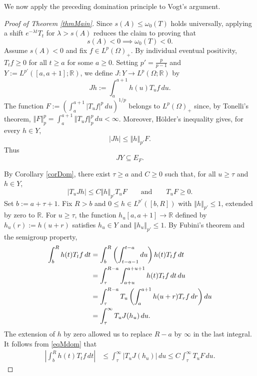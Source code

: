 \documentclass[12pt]{amsart}
\theoremstyle{plain}
\theoremstyle{definition}
\newcommand{\R}{\mathbb{R}}
\newcommand{\norm}[1]{\left\Vert #1\right\Vert}
\begin{document}
	We now apply the preceding domination principle to Vogt's argument.
	
	\begin{proof}[Proof of Theorem \ref{thmMain}]
		
		Since $s(A) \le \omega_0(T)$ holds universally, applying a shift $e^{-\lambda t}T_t$ for $\lambda > s(A)$ reduces the claim to proving that
		\[
		s(A) < 0 \implies \omega_0(T) < 0.
		\]
		Assume $s(A) < 0$ and fix $f \in L^p(\Omega)_+$. By individual eventual positivity, $T_t f \ge 0$ for all $t \ge a$ for some $a \ge 0$. Setting $p' = \frac{p}{p-1}$ and $Y := L^{p'}([a,a+1]; \mathbb{R})$, we define $J \colon Y \to L^p(\Omega; \mathbb{R})$ by
		\[
		Jh := \int_a^{a+1} h(u) T_u f \, du.
		\]
		The function $F := \left( \int_a^{a+1} |T_u f|^p \, du \right)^{1/p}$ belongs to $L^p(\Omega)_+$ since, by Tonelli's theorem, $\norm{F}_p^p = \int_a^{a+1} \norm{T_u f}_p^p \, du < \infty$.
		Moreover, H\"older's inequality gives, for every $h\in Y$,
		\begin{equation}
			\label{eqJf}
			|Jh|
			\le
			\norm{h}_{p'}F.
		\end{equation}
		Thus
		\[
		JY\subseteq E_F.
		\]
		
		By Corollary \ref{corDom}, there exist $\tau \ge a$ and $C \ge 0$ such that, for all $u \ge \tau$ and $h \in Y$,
		\begin{equation}
			\label{eqMdom}
			|T_u Jh| \le C \norm{h}_{p'} T_u F \qquad \text{and} \qquad T_u F \ge 0.
		\end{equation}
		Set $b := a + \tau + 1$. Fix $R > b$ and $0 \le h \in L^{p'}([b,R])$ with $\norm{h}_{p'} \le 1$, extended by zero to $\mathbb{R}$. For $u \ge \tau$, the function $h_u [a,a+1] \rightarrow \R$ defined by $h_u(r) := h(u+r)$ satisfies $h_u \in Y$ and $\norm{h_u}_{p'} \le 1$.
		By Fubini's theorem and the semigroup property,
		\begin{align}
			\int_b^R h(t)T_tf\,dt
			&=
			\int_b^R
			\left(
			\int_{t-a-1}^{t-a}du
			\right)
			h(t)T_tf\,dt
			\notag\\
			&=
			\int_\tau^{R-a}
			\int_{a+u}^{a+u+1}
			h(t)T_tf\,dt\,du
			\notag\\
			&=
			\int_\tau^{R-a}
			T_u
			\left(
			\int_a^{a+1}
			h(u+r)T_rf\,dr
			\right)
			du
			\notag\\
			&=
			\int_\tau^{\infty}
			T_uJ(h_u)\,du.
			\label{eqFub}
		\end{align}
		The extension of $h$ by zero allowed us to replace
		$R-a$ by $\infty$ in the last integral.
		It follows from \eqref{eqMdom} that
		\begin{align}\label{eqAvg}
			\left|
			\int_b^R h(t)T_tf\,dt
			\right|
			&\le
			\int_\tau^{\infty}|T_uJ(h_u)|\,du
			\le
			C\int_\tau^\infty T_uF\,du.
		\end{align}
		

\end{proof}
\end{document}
